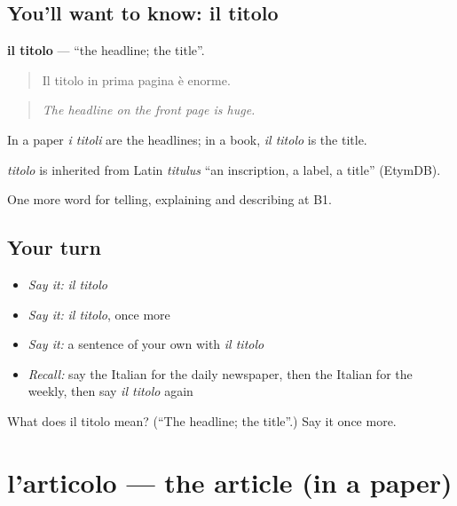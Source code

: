 \subsection*{You'll want to know: il titolo}
\textbf{il titolo} — \textquotedblleft{}the headline; the title\textquotedblright{}.

\begin{quote}
Il titolo in prima pagina è enorme.
\end{quote}

\begin{quote}
\emph{The headline on the front page is huge.}
\end{quote}

In a paper \emph{i titoli} are the headlines; in a book, \emph{il titolo} is the title.

\begin{cousinweb}
\emph{titolo} is inherited from Latin \emph{titulus} \textquotedblleft{}an inscription, a label, a title\textquotedblright{} (EtymDB).
\end{cousinweb}

\begin{grammarlens}[title={What you've built}]
One more word for telling, explaining and describing at B1.
\end{grammarlens}

\subsection*{Your turn}
\begin{itemize}
\raggedright
  \item \emph{Say it:} \emph{il titolo}
  \item \emph{Say it:} \emph{il titolo}, once more
  \item \emph{Say it:} a sentence of your own with \emph{il titolo}
  \item \emph{Recall:} say the Italian for the daily newspaper, then the Italian for the weekly, then say \emph{il titolo} again
\end{itemize}

\begin{tcolorbox}[breakable,colback=teal!4,colframe=teal!35!black,title={Before you move on}]
What does il titolo mean? (\textquotedblleft{}The headline; the title\textquotedblright{}.) Say it once more.
\end{tcolorbox}
\section[l'articolo]{l'articolo — the article (in a paper)}

